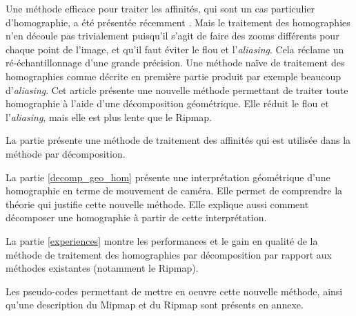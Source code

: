 	Une méthode efficace pour traiter les affinités, qui sont un cas particulier d'homographie, a été présentée récemment \cite{szeliski2010high}. Mais le traitement des homographies n'en découle pas trivialement puisqu'il s'agit de faire des zooms différents pour chaque point de l'image, et qu'il faut éviter le flou et l'\emph{aliasing}. Cela réclame un ré-échantillonnage d'une grande précision. Une méthode naïve de traitement des homographies comme décrite en première partie produit par exemple beaucoup d'\emph{aliasing}. Cet article présente une nouvelle méthode permettant de traiter toute homographie à l'aide d'une décomposition géométrique. Elle réduit le flou et l'\emph{aliasing}, mais elle est plus lente que le Ripmap.

	La partie \label{szeliski_section} présente une méthode de traitement des affinités qui est utilisée dans la méthode par décomposition.

	La partie \ref{decomp_geo_hom} présente une interprétation géométrique d'une homographie en terme de mouvement de caméra. Elle permet de comprendre la théorie qui justifie cette nouvelle méthode. Elle explique aussi comment décomposer une homographie à partir de cette interprétation.

	La partie \ref{experiences} montre les performances et le gain en qualité de la méthode de traitement des homographies par décomposition par rapport aux méthodes existantes (notamment le Ripmap).

	Les pseudo-codes permettant de mettre en oeuvre cette nouvelle méthode, ainsi qu'une description du Mipmap et du Ripmap sont présents en annexe.
